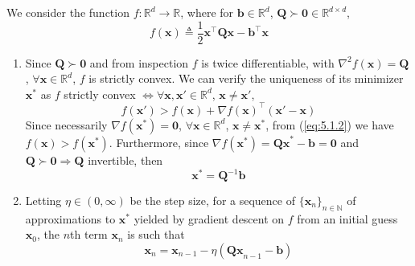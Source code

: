 \documentclass{article}
\numberwithin{equation}{section}
\begin{document}

We consider the function $ f : \mathbb{R}^d \rightarrow \mathbb{R} $, where
for $ \mathbf{b} \in \mathbb{R}^d $, $ \mathbf{Q} \succ \mathbf{0} \in
\mathbb{R}^{d \times d} $,
\begin{equation} \label{eq:5.1.1}
    f(\mathbf{x}) \triangleq
    \frac{1}{2}\mathbf{x}^\top\mathbf{Qx} - \mathbf{b}^\top\mathbf{x}
\end{equation}

\begin{enumerate}[label=\alph*.]
    \item
    Since $ \mathbf{Q} \succ \mathbf{0} $ and from inspection $ f $ is twice
    differentiable, with $ \nabla^2f(\mathbf{x}) = \mathbf{Q} $,
    $ \forall \mathbf{x} \in \mathbb{R}^d $, $ f $ is strictly convex. We can
    verify the uniqueness of its minimizer $ \mathbf{x}^* $ as $ f $ strictly
    convex $\Leftrightarrow \forall \mathbf{x}, \mathbf{x}' \in
    \mathbb{R}^d $, $ \mathbf{x} \ne \mathbf{x}' $,
    \begin{equation} \label{eq:5.1.2}
        f(\mathbf{x}') >
        f(\mathbf{x}) + \nabla f(\mathbf{x})^\top(\mathbf{x}' - \mathbf{x})
    \end{equation}
    Since necessarily $ \nabla f(\mathbf{x}^*) = \mathbf{0} $,
    $ \forall \mathbf{x} \in \mathbb{R}^d $, $ \mathbf{x} \ne \mathbf{x}^* $,
    from (\ref{eq:5.1.2}) we have $ f(\mathbf{x}) > f(\mathbf{x}^*) $.
    Furthermore, since $ \nabla f(\mathbf{x}^*) = \mathbf{Qx}^* - \mathbf{b} =
    \mathbf{0} $ and $ \mathbf{Q} \succ \mathbf{0} \Rightarrow \mathbf{Q} $
    invertible, then
    \begin{equation} \label{eq:5.1.3}
        \mathbf{x}^* = \mathbf{Q}^{-1}\mathbf{b}
    \end{equation}

    \item
    Letting $ \eta \in (0, \infty) $ be the step size, for a sequence of
    $ \{\mathbf{x}_n\}_{n \in \mathbb{N}} $ of approximations to
    $ \mathbf{x}^* $ yielded by gradient descent on $ f $ from an initial
    guess $ \mathbf{x}_0 $, the $ n $th term $ \mathbf{x}_n $ is such that
    \begin{equation} \label{eq:5.1.4}
        \mathbf{x}_n =
        \mathbf{x}_{n - 1} - \eta(\mathbf{Qx}_{n - 1} - \mathbf{b})
    \end{equation}


\end{enumerate}
\end{document}
